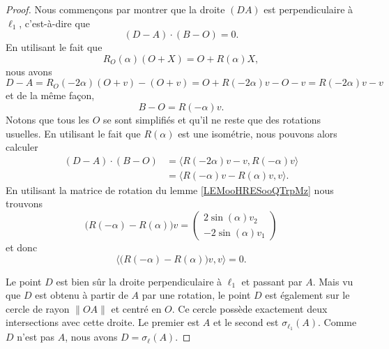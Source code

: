 \begin{proof}
	Nous commençons par montrer que la droite \( (DA)\) est perpendiculaire à \( \ell_1\), c'est-à-dire que
	\begin{equation}
		(D-A)\cdot (B-O)=0.
	\end{equation}
	En utilisant le fait que
	\begin{equation}
		R_O(\alpha)(O+X)=O+R(\alpha)X,
	\end{equation}
	nous avons
	\begin{equation}
		D-A=R_O(-2\alpha)(O+v)-(O+v)=O+R(-2\alpha)v-O-v=R(-2\alpha)v-v
	\end{equation}
	et de la même façon,
	\begin{equation}
		B-O=R(-\alpha)v.
	\end{equation}
	Notons que tous les \( O\) se sont simplifiés et qu'il ne reste que des rotations usuelles. En utilisant le fait que \( R(\alpha)\) est une isométrie, nous pouvons alors calculer
	\begin{subequations}
		\begin{align}
			(D-A)\cdot (B-O) & =\langle R(-2\alpha)v-v, R(-\alpha)v\rangle \\
			                 & =\langle R(-\alpha)v-R(\alpha)v, v\rangle.
		\end{align}
	\end{subequations}
	En utilisant la matrice de rotation du lemme \ref{LEMooHRESooQTrpMz} nous trouvons
	\begin{equation}
		\big( R(-\alpha)-R(\alpha) \big)v=\begin{pmatrix}
			2\sin(\alpha)v_2 \\
			-2\sin(\alpha)v_1
		\end{pmatrix}
	\end{equation}
	et donc
	\begin{equation}
		\langle  \big( R(-\alpha)-R(\alpha) \big)v  , v\rangle =0.
	\end{equation}

	Le point \( D\) est bien sûr la droite perpendiculaire à \( \ell_1\) et passant par \( A\). Mais vu que \( D\) est obtenu à partir de \( A\) par une rotation, le point \( D\) est également sur le cercle de rayon \( \| OA \|\) et centré en \( O\). Ce cercle possède exactement deux intersections avec cette droite. Le premier est \( A\) et le second est \( \sigma_{\ell_1}(A)\). Comme \( D\) n'est pas \( A\), nous avons \( D=\sigma_{\ell}(A)\).
\end{proof}


